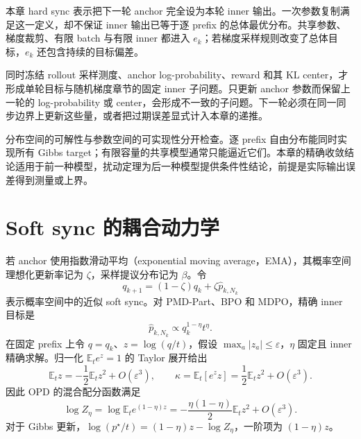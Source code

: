 \documentclass[lang=cn,scheme=chinese,openany]{../book/elegantbook}
\newcommand{\E}{\mathbb E}
\begin{document}
本章 hard sync 表示把下一轮 anchor 完全设为本轮 inner 输出。一次参数复制满足这一定义，却不保证 inner 输出已等于逐 prefix 的总体最优分布。共享参数、梯度裁剪、有限 batch 与有限 inner 都进入 $e_k$；若梯度采样规则改变了总体目标，$e_k$ 还包含持续的目标偏差。

同时冻结 rollout 采样测度、anchor log-probability、reward 和其 KL center，才形成单轮目标与随机梯度章节的固定 inner 子问题。只更新 anchor 参数而保留上一轮的 log-probability 或 center，会形成不一致的子问题。下一轮必须在同一同步边界上更新这些量，或者把过期误差显式计入本章的递推。

分布空间的可解性与参数空间的可实现性分开检查。逐 prefix 自由分布能同时实现所有 Gibbs target；有限容量的共享模型通常只能逼近它们。本章的精确收敛结论适用于前一种模型，扰动定理为后一种模型提供条件性结论，前提是实际输出误差得到测量或上界。



\section{Soft sync 的耦合动力学}

若 anchor 使用指数滑动平均（exponential moving average，EMA），其概率空间理想化更新率记为 $\zeta$，采样提议分布记为 $\beta$。令
\begin{equation*}
 q_{k+1}=(1-\zeta)q_k+\zeta\widehat p_{k,N_k}
\end{equation*}
表示概率空间中的近似 soft sync。对 PMD-Part、BPO 和 MDPO，精确 inner 目标是
\begin{equation*}
 \widehat p_{k,N_k}\propto q_k^{1-\eta}t^\eta.
\end{equation*}
在固定 prefix 上令 $q=q_k$、$z=\log(q/t)$，假设 $\max_a|z_a|\le\varepsilon$，$\eta$ 固定且 inner 精确求解。归一化 $\E_te^z=1$ 的 Taylor 展开给出
\begin{equation*}
\E_tz=-\frac12\E_tz^2+O(\varepsilon^3),\qquad
\kappa=\E_t[e^zz]=\frac12\E_tz^2+O(\varepsilon^3).
\end{equation*}
因此 OPD 的混合配分函数满足
\begin{equation*}
\log Z_\eta=\log\E_te^{(1-\eta)z}
=-\frac{\eta(1-\eta)}2\E_tz^2+O(\varepsilon^3).
\end{equation*}
对于 Gibbs 更新，$\log(p^\star/t)=(1-\eta)z-\log Z_\eta$，一阶项为 $(1-\eta)z$。
\end{document}
